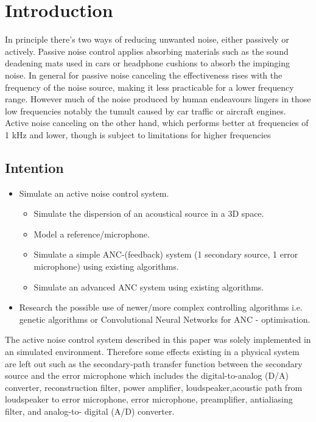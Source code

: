 \chapter{Introduction}
\label{chap:introduction}

In principle there's two ways of reducing unwanted noise, either passively or actively. Passive noise control applies absorbing materials such as the sound deadening mats used in cars or headphone cushions to absorb the impinging noise. In general for passive noise canceling the effectiveness rises with the frequency of the noise source, making it less practicable for a lower frequency range.\cite{Chen2017} However much of the noise produced by human endeavours lingers in those low frequencies notably the tumult caused by car traffic or aircraft engines. Active noise canceling on the other hand, which performs better at frequencies of 1 kHz and lower, though is subject to limitations for higher frequencies \

\section{Intention}
    \begin{itemize}
        \item Simulate an active noise control system. 
    \begin{itemize}
        \item Simulate the dispersion of an acoustical source in a 3D space.
        \item Model a reference/microphone.
        \item Simulate a simple ANC-(feedback) system (1 secondary source, 1 error microphone) using existing algorithms.
        \item Simulate an advanced ANC system using existing algorithms.
    \end{itemize}
        \item Research the possible use of newer/more complex controlling algorithms i.e. genetic algorithms or Convolutional Neural Networks for ANC - optimisation.
\end{itemize}


The active noise control system described in this paper was solely implemented in an simulated environment. Therefore some effects existing in a physical system are left out such as the secondary-path transfer function between the secondary source and the error microphone which includes the digital-to-analog (D/A) converter, reconstruction filter, power amplifier, loudspeaker,acoustic path from loudspeaker to error microphone, error microphone, preamplifier, antialiasing filter, and analog-to- digital (A/D) converter.\cite{Kuo1999}


